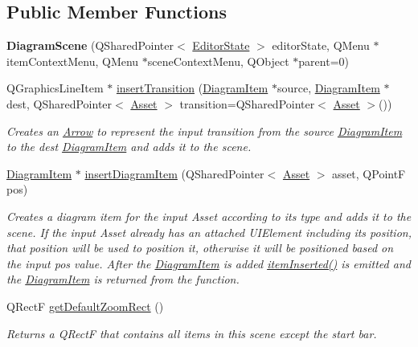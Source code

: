 \subsection*{Public Member Functions}
\begin{DoxyCompactItemize}
\item 
\hypertarget{class_diagram_scene_a9b9d7a9929d09db1eb9ae8b88e3489eb}{{\bfseries Diagram\-Scene} (Q\-Shared\-Pointer$<$ \hyperlink{class_editor_state}{Editor\-State} $>$ editor\-State, Q\-Menu $\ast$item\-Context\-Menu, Q\-Menu $\ast$scene\-Context\-Menu, Q\-Object $\ast$parent=0)}\label{class_diagram_scene_a9b9d7a9929d09db1eb9ae8b88e3489eb}

\item 
Q\-Graphics\-Line\-Item $\ast$ \hyperlink{class_diagram_scene_aa8b98aea4192297641cb2347106fa31d}{insert\-Transition} (\hyperlink{class_diagram_item}{Diagram\-Item} $\ast$source, \hyperlink{class_diagram_item}{Diagram\-Item} $\ast$dest, Q\-Shared\-Pointer$<$ \hyperlink{class_picto_1_1_asset}{Asset} $>$ transition=Q\-Shared\-Pointer$<$ \hyperlink{class_picto_1_1_asset}{Asset} $>$())
\begin{DoxyCompactList}\small\item\em Creates an \hyperlink{class_arrow}{Arrow} to represent the input transition from the source \hyperlink{class_diagram_item}{Diagram\-Item} to the dest \hyperlink{class_diagram_item}{Diagram\-Item} and adds it to the scene. \end{DoxyCompactList}\item 
\hypertarget{class_diagram_scene_adf0f92ac89ed29358b2a2f7b4b479877}{\hyperlink{class_diagram_item}{Diagram\-Item} $\ast$ \hyperlink{class_diagram_scene_adf0f92ac89ed29358b2a2f7b4b479877}{insert\-Diagram\-Item} (Q\-Shared\-Pointer$<$ \hyperlink{class_picto_1_1_asset}{Asset} $>$ asset, Q\-Point\-F pos)}\label{class_diagram_scene_adf0f92ac89ed29358b2a2f7b4b479877}

\begin{DoxyCompactList}\small\item\em Creates a diagram item for the input Asset according to its type and adds it to the scene.  If the input Asset already has an attached U\-I\-Element including its position, that position will be used to position it, otherwise it will be positioned based on the input pos value. After the \hyperlink{class_diagram_item}{Diagram\-Item} is added \hyperlink{class_diagram_scene_af831d659c3c3b3427a1376a738d27df1}{item\-Inserted()} is emitted and the \hyperlink{class_diagram_item}{Diagram\-Item} is returned from the function. \end{DoxyCompactList}\item 
Q\-Rect\-F \hyperlink{class_diagram_scene_ada3bc85f1770830b379ffc70d5aeb60d}{get\-Default\-Zoom\-Rect} ()
\begin{DoxyCompactList}\small\item\em Returns a Q\-Rect\-F that contains all items in this scene except the start bar. \end{DoxyCompactList}\end{DoxyCompactItemize}
